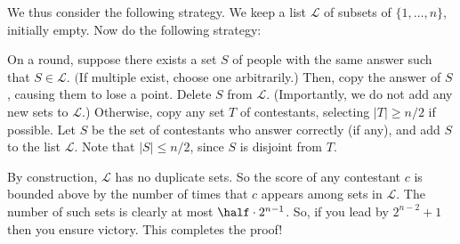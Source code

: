 We thus consider the following strategy.
We keep a list $\mathcal L$ of subsets of $\{1, \dots, n\}$, initially empty.
Now do the following strategy:
\begin{itemize}
  \ii On a round, suppose there exists a set $S$ of people
  with the same answer such that $S \in \mathcal L$.
  $($If multiple exist, choose one arbitrarily.)
  Then, copy the answer of $S$, causing them to lose a point.
  Delete $S$ from $\mathcal L$.
  (Importantly, we do not add any new sets to $\mathcal L$.)
  \ii Otherwise, copy any set $T$ of contestants,
  selecting $|T| \ge n/2$ if possible.
  Let $S$ be the set of contestants who answer correctly (if any),
  and add $S$ to the list $\mathcal L$.
  Note that $|S| \le n/2$, since $S$ is disjoint from $T$.
\end{itemize}
By construction, $\mathcal L$ has no duplicate sets.
So the score of any contestant $c$ is bounded above by the number of times
that $c$ appears among sets in $\mathcal L$.
The number of such sets is clearly at most $\half \cdot 2^{n-1}$.
So, if you lead by $2^{n-2}+1$ then you ensure victory.
This completes the proof!

